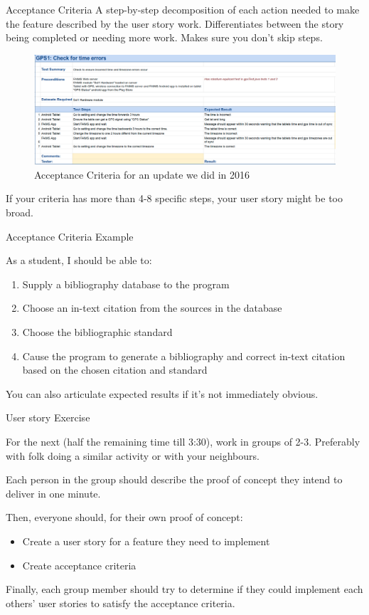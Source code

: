 \documentclass[aspectratio=1610, 11pt]{beamer} %
\begin{document}
\begin{frame}{Acceptance Criteria}
A step-by-step decomposition of each action needed to make the feature described by the user story work. Differentiates between the story being completed or needing more work. Makes sure you don't skip steps.
\begin{figure}
    \centering
    \includegraphics[width=\textwidth]{figures/acceptance.png}
    \caption{Acceptance Criteria for an update we did in 2016}
    \label{fig:my_label}
\end{figure}

If your criteria has more than 4-8 specific steps, your user story might be too broad. 
\end{frame}

\begin{frame}{Acceptance Criteria Example}

As a student, I should be able to: 
\begin{enumerate}[1.]
    \item Supply a bibliography database to the program
    \item Choose an in-text citation from the sources in the database
    \item Choose the bibliographic standard
    \item Cause the program to generate a bibliography and correct in-text citation based on the chosen citation and standard
\end{enumerate}

You can also articulate expected results if it's not immediately obvious. 

\end{frame}
\begin{frame}{User story Exercise}

For the next (half the remaining time till 3:30), work in groups of 2-3. Preferably with folk doing a similar activity or with your neighbours.

Each person in the group should describe the proof of concept they intend to deliver in one minute.

Then, everyone should, for their own proof of concept:
\begin{itemize}[\textbullet]
    \item Create a user story for a feature they need to implement
    \item Create acceptance criteria
    \end{itemize}

Finally, each group member should try to determine if they could implement each others' user stories to satisfy the acceptance criteria. 

\end{frame}
\end{document}
